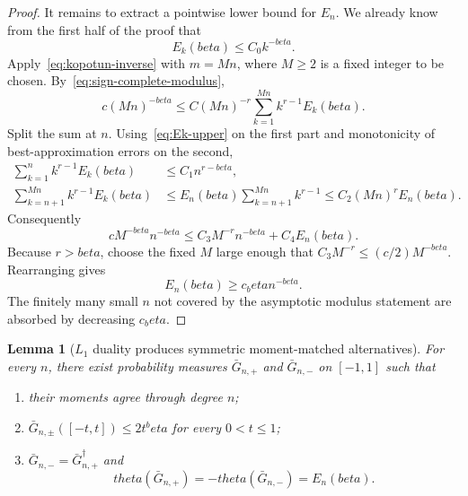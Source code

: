 \documentclass[11pt]{article}
\def\beta{beta}%
\def\theta{theta}%
\newtheorem{lemma}[theorem]{Lemma}
\begin{document}
\begin{proof}
It remains to extract a pointwise lower bound for $E_n$.  We already know from the first half of the proof that
\begin{equation}
\label{eq:Ek-upper}
E_k(\beta)\le C_0k^{-\beta}.
\end{equation}
Apply~\eqref{eq:kopotun-inverse} with $m=Mn$, where $M\ge2$ is a fixed integer to be chosen.  By~\eqref{eq:sign-complete-modulus},
\[
c(Mn)^{-\beta}
\le
C(Mn)^{-r}
\sum_{k=1}^{Mn}k^{r-1}E_k(\beta).
\]
Split the sum at $n$.  Using~\eqref{eq:Ek-upper} on the first part and monotonicity of best-approximation errors on the second,
\begin{align*}
\sum_{k=1}^{n}k^{r-1}E_k(\beta)
&\le C_1n^{r-\beta},\\
\sum_{k=n+1}^{Mn}k^{r-1}E_k(\beta)
&\le E_n(\beta)\sum_{k=n+1}^{Mn}k^{r-1}
\le C_2(Mn)^rE_n(\beta).
\end{align*}
Consequently
\[
cM^{-\beta}n^{-\beta}
\le
C_3M^{-r}n^{-\beta}+C_4E_n(\beta).
\]
Because $r>\beta$, choose the fixed $M$ large enough that
$C_3M^{-r}\le(c/2)M^{-\beta}$.  Rearranging gives
\[
E_n(\beta)\ge c_\beta n^{-\beta}.
\]
The finitely many small $n$ not covered by the asymptotic modulus statement are absorbed by decreasing $c_\beta$.
\end{proof}

\begin{lemma}[$L_1$ duality produces symmetric moment-matched alternatives]
\label{lem:duality-moment-pair}
For every $n$, there exist probability measures $\bar G_{n,+}$ and $\bar G_{n,-}$ on $[-1,1]$ such that
\begin{enumerate}[label=(\alph*)]
\item their moments agree through degree $n$;
\item $\bar G_{n,\pm}([-t,t])\le2t^\beta$ for every $0<t\le1$;
\item $\bar G_{n,-}=\bar G_{n,+}^\dagger$ and
\[
\theta(\bar G_{n,+})=-\theta(\bar G_{n,-})=E_n(\beta).
\]
\end{enumerate}
\end{lemma}
\end{document}
